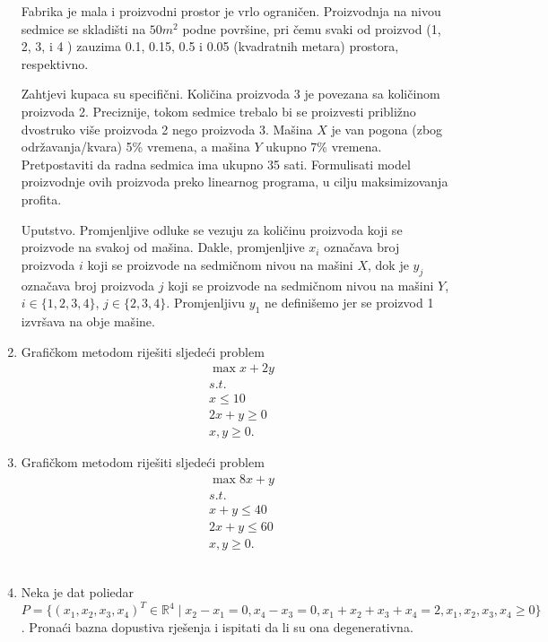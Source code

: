 \documentclass[a4paper, utf8, 11pt, colorlinks]{book}
\theoremstyle{definition}
\begin{document}
\begin{enumerate}
Fabrika je  mala i proizvodni prostor je vrlo ograničen. Proizvodnja na nivou sedmice se skladišti na $50 m^2$ podne površine, pri čemu svaki od proizvod (1, 2, 3, i 4 ) zauzima 0.1, 0.15, 0.5 i 0.05 (kvadratnih metara) prostora,  respektivno. 

Zahtjevi kupaca su specifični. Količina proizvoda 3 je povezana sa količinom  proizvoda 2. Preciznije, tokom sedmice trebalo bi se proizvesti približno dvostruko više  proizvoda 2 nego proizvoda 3. Mašina $X$ je van pogona (zbog održavanja/kvara) 5\% vremena, a mašina $Y$ ukupno 7\% vremena.
Pretpostaviti da radna sedmica ima ukupno 35 sati. Formulisati model proizvodnje ovih proizvoda preko linearnog programa, u cilju maksimizovanja profita. 

Uputstvo. Promjenljive odluke se vezuju za količinu proizvoda koji se proizvode na svakoj od mašina.  Dakle, 
promjenljive $x_i$ označava broj proizvoda $i$ koji se proizvode na sedmičnom nivou na mašini $X$, dok je $y_j$ označava  broj proizvoda $j$ koji se proizvode na sedmičnom nivou na mašini $Y$, $i \in \{1,2,3,4\}$, $j \in \{2,3,4\}$. Promjenljivu $y_1$ ne definišemo jer se proizvod 1 izvršava na obje mašine.  

	\item Grafičkom metodom riješiti sljedeći problem
	\begin{align*}
		&\max   x + 2 y \\
		& s.t. \\
		& x \leq 10 \\
		& 2 x + y\geq 0 \\
		& x,y \geq 0.
	\end{align*}
	\item Grafičkom metodom riješiti sljedeći problem 
	\begin{align*}
		& \max  8 x + y \\
		& s.t. \\
		&  x + y \leq 40 \\
		& 2x + y \leq 60 \\
		& x,y \geq 0.
	\end{align*}
\\

\item Neka je dat poliedar $P= \{ (x_1,x_2,x_3, x_4)^T \in \mathbb{R}^4 \mid x_2 - x_1 = 0, x_4 - x_3 = 0,  x_1 + x_2 +   x_3 + x_4 = 2, x_1,x_2,x_3, x_4 \geq 0 \}$.  Pronaći bazna dopustiva rješenja i ispitati da li su ona degenerativna.  
  
\end{enumerate}
\end{document}
